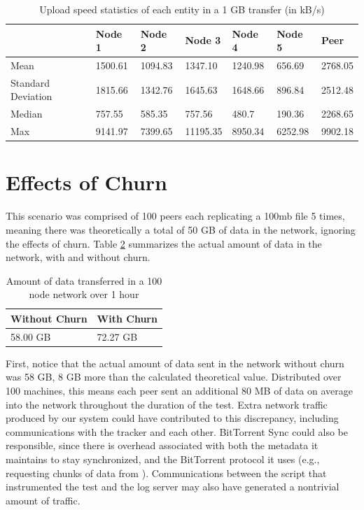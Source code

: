 \documentclass[12pt]{report}
\begin{document}
\begin{table}
\begin{center}
    \begin{tabular}{| l | l | l | l | l | l | l |}
    \hline
    & Node 1 & Node 2 & Node 3 & Node 4 & Node 5 & Peer \\ \hline
    Mean & 1500.61 & 1094.83 & 1347.10 & 1240.98 & 656.69 & 2768.05\\ \hline
    Standard Deviation & 1815.66 & 1342.76 & 1645.63 & 1648.66 & 896.84 & 2512.48 \\ \hline
    Median & 757.55 & 585.35 & 757.56 & 480.7 & 190.36 & 2268.65 \\ \hline
    Max & 9141.97 & 7399.65 & 11195.35 & 8950.34 & 6252.98 & 9902.18 \\ \hline
    \end{tabular}
    \caption{Upload speed statistics of each entity in a 1 GB transfer (in kB/s)}
    \label{tab:UploadBackupSpeed}
\end{center}
\end{table}

\section{Effects of Churn} \label{sec:EffectsofChurn_chap:Results}

This scenario was comprised of 100 peers each replicating a 100mb file 5 times, meaning there was theoretically a total of 50 GB of data in the network, ignoring the effects of churn. Table \ref{tab:ChurnBandwidth} summarizes the actual amount of data in the network, with and without churn.

\begin{table}
\begin{center}
    \begin{tabular}{| l | l |}
    \hline
    Without Churn & With Churn \\ \hline
    58.00 GB & 72.27 GB\\ \hline
    \end{tabular}
    \caption{Amount of data transferred in a 100 node network over 1 hour}
    \label{tab:ChurnBandwidth}
\end{center}
\end{table}

First, notice that the actual amount of data sent in the network without churn was 58 GB, 8 GB more than the calculated theoretical value. Distributed over 100 machines, this means each peer sent an additional 80 MB of data on average into the network throughout the duration of the test. Extra network traffic produced by our system could have contributed to this discrepancy, including communications with the tracker and each other. BitTorrent Sync could also be responsible, since there is overhead associated with both the metadata it maintains to stay synchronized, and the BitTorrent protocol it uses (e.g., requesting chunks of data from ). Communications between the script that instrumented the test and the log server may also have generated a nontrivial amount of traffic.
\end{document}
